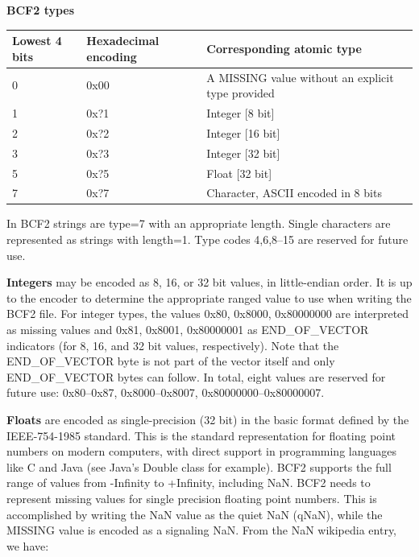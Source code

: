 \documentclass[8pt]{article}
\begin{document}
\textbf{BCF2 types}

\vspace{0.3cm}
\begin{tabular}{|l | l | l|} \hline
Lowest 4 bits & Hexadecimal encoding & Corresponding atomic type \\ \hline
0 & 0x00 & A MISSING value without an explicit type provided \\ \hline
1 & 0x?1 & Integer [8 bit] \\ \hline
2 & 0x?2 & Integer [16 bit] \\ \hline
3 & 0x?3 & Integer [32 bit] \\ \hline
5 & 0x?5 & Float [32 bit] \\ \hline
7 & 0x?7 & Character, ASCII encoded in 8 bits \\ \hline
\end{tabular}
\vspace{0.3cm}

In BCF2 strings are type=7 with an appropriate length.
Single characters are represented as strings with length=1.
Type codes 4,6,8--15 are reserved for future use.

\vspace{0.3cm}

\textbf{Integers} may be encoded as 8, 16, or 32 bit values, in little-endian order.
It is up to the encoder to determine the appropriate ranged value to use when writing the BCF2 file.
For integer types, the values 0x80, 0x8000, 0x80000000 are interpreted as missing values and 0x81, 0x8001, 0x80000001 as END\_OF\_VECTOR indicators (for 8, 16, and 32 bit values, respectively).
Note that the END\_OF\_VECTOR byte is not part of the vector itself and only END\_OF\_VECTOR bytes can follow.
In total, eight values are reserved for future use: 0x80--0x87, 0x8000--0x8007, 0x80000000--0x80000007.

\vspace{0.3cm}
\textbf{Floats} are encoded as single-precision (32 bit) in the basic format defined by the IEEE-754-1985 standard.
This is the standard representation for floating point numbers on modern computers, with direct support in programming languages like C and Java (see Java's Double class for example).
BCF2 supports the full range of values from -Infinity to +Infinity, including NaN.
BCF2 needs to represent missing values for single precision floating point numbers.
This is accomplished by writing the NaN value as the quiet NaN (qNaN), while the MISSING value is encoded as a signaling NaN.
From the NaN wikipedia entry, we have:
\end{document}
